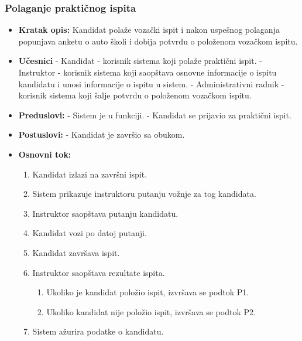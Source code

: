 \subsubsection{Polaganje praktičnog ispita}

\vspace{3mm}

\begin{itemize}

\item \textbf{Kratak opis:} Kandidat polaže vozački ispit i nakon uspešnog polaganja popunjava anketu o auto školi i dobija potvrdu o položenom vozačkom ispitu.

\vspace{2mm}

\item \textbf{Učesnici} \newline
   - Kandidat - korisnik sistema koji polaže praktični ispit.\newline   
   - Instruktor - korisnik sistema koji saopštava osnovne informacije o ispitu kandidatu i unosi informacije o ispitu u sistem.\newline
   - Administrativni radnik - korisnik sistema koji šalje potvrdu o položenom vozačkom ispitu. 
   
\item \textbf{Preduslovi:} \newline
   - Sistem je u funkciji. \newline
   - Kandidat se prijavio za praktični ispit.

\item \textbf{Postuslovi:} \newline
    - Kandidat je završio sa obukom.

\item \textbf{Osnovni tok:}  
   \begin{enumerate}
   \item Kandidat izlazi na završni ispit.
   \item Sistem prikazuje instruktoru putanju vožnje za tog kandidata.
   \item Instruktor saopštava putanju kandidatu.
   \item Kandidat vozi po datoj putanji.
   \item Kandidat završava ispit.
   \item Instruktor saopštava rezultate ispita.
   \begin{enumerate}
       \item Ukoliko je kandidat položio ispit, izvršava se podtok P1.
       \item Ukoliko kandidat nije položio ispit, izvršava se podtok P2.
   \end{enumerate}
   \item Sistem ažurira podatke o kandidatu.     


\end{enumerate}
\end{itemize}

